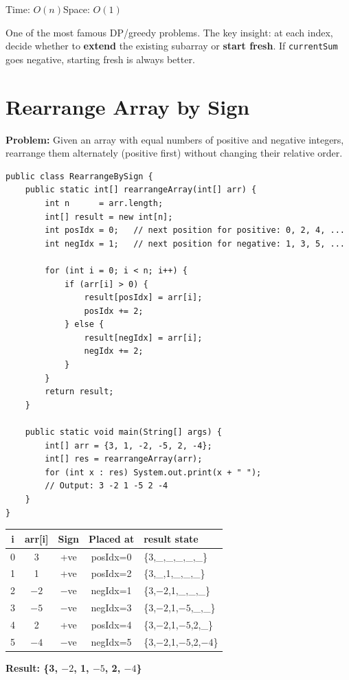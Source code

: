 \documentclass[12pt,a4paper,oneside]{book}
\begin{document}
\begin{complexity}
Time: $O(n)$\quad Space: $O(1)$
\end{complexity}

\begin{interviewcorner}
One of the most famous DP/greedy problems. The key insight: at each index, decide whether to \textbf{extend} the existing subarray or \textbf{start fresh}. If \texttt{currentSum} goes negative, starting fresh is always better.
\end{interviewcorner}

\section{Rearrange Array by Sign}

\textbf{Problem:} Given an array with equal numbers of positive and negative integers, rearrange them alternately (positive first) without changing their relative order.

\begin{lstlisting}[caption={Rearrange Alternating Positive and Negative}]
public class RearrangeBySign {
    public static int[] rearrangeArray(int[] arr) {
        int n      = arr.length;
        int[] result = new int[n];
        int posIdx = 0;   // next position for positive: 0, 2, 4, ...
        int negIdx = 1;   // next position for negative: 1, 3, 5, ...

        for (int i = 0; i < n; i++) {
            if (arr[i] > 0) {
                result[posIdx] = arr[i];
                posIdx += 2;
            } else {
                result[negIdx] = arr[i];
                negIdx += 2;
            }
        }
        return result;
    }

    public static void main(String[] args) {
        int[] arr = {3, 1, -2, -5, 2, -4};
        int[] res = rearrangeArray(arr);
        for (int x : res) System.out.print(x + " ");
        // Output: 3 -2 1 -5 2 -4
    }
}
\end{lstlisting}

\begin{dryrun}[Dry Run: arr = \{3, 1, $-2$, $-5$, 2, $-4$\}]
\begin{center}
\begin{tabular}{ccccl}
\toprule
\textbf{i} & \textbf{arr[i]} & \textbf{Sign} & \textbf{Placed at} & \textbf{result state}\\
\midrule
0 & 3    & +ve & posIdx=0 & \{3,\_,\_,\_,\_,\_\}\\
1 & 1    & +ve & posIdx=2 & \{3,\_,1,\_,\_,\_\}\\
2 & $-2$ & $-$ve & negIdx=1 & \{3,$-2$,1,\_,\_,\_\}\\
3 & $-5$ & $-$ve & negIdx=3 & \{3,$-2$,1,$-5$,\_,\_\}\\
4 & 2    & +ve & posIdx=4 & \{3,$-2$,1,$-5$,2,\_\}\\
5 & $-4$ & $-$ve & negIdx=5 & \{3,$-2$,1,$-5$,2,$-4$\}\\
\bottomrule
\end{tabular}
\end{center}
\textbf{Result: \{3, $-2$, 1, $-5$, 2, $-4$\}}
\end{dryrun}
\end{document}
